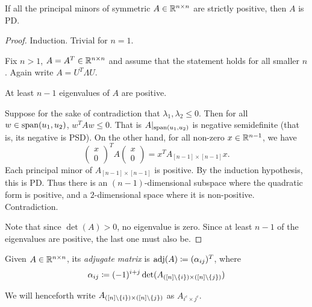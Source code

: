 \begin{lemma}
    If all the principal minors of symmetric $A \in \mathbb{R}^{n \times n}$
    are strictly positive, then $A$ is PD.
\end{lemma}
\begin{proof}
    Induction.
    Trivial for $n = 1$.

    Fix $n > 1$, $A = A^T \in \mathbb{R}^{n \times n}$ and assume that the statement
    holds for all smaller $n$.
    Again write $A = U^T \Lambda U$.

    \begin{claim}
        At least $n - 1$ eigenvalues of $A$ are positive.
    \end{claim}
    \begin{subproof}
        Suppose for the sake of contradiction that
        $\lambda_1, \lambda_2 \le 0$.
        Then for all $w \in \operatorname{span}(u_1, u_2)$,
        $w^T A w \le 0$.
        That is $A\vert_{\operatorname{span}(u_1, u_2)}$ is negative semidefinite
        (that is, its negative is PSD).
        On the other hand, for all non-zero $x \in \mathbb{R}^{n-1}$,
        we have \[
            \begin{pmatrix}
                x \\
                0
            \end{pmatrix}^T A \begin{pmatrix}
                x \\
                0
            \end{pmatrix} = x^T A_{[n-1] \times [n-1]} x.
        \] Each principal minor of $A_{[n-1] \times [n-1]}$ is positive.
        By the induction hypothesis, this is PD.
        Thus there is an $(n-1)$-dimensional subspace where the quadratic
        form is positive, and a $2$-dimensional space where it is
        non-positive.
        Contradiction.
    \end{subproof}
    Note that since $\det(A) > 0$, no eigenvalue is zero.
    Since at least $n - 1$ of the eigenvalues are positive, the last one
    must also be.
\end{proof}

\begin{definition} \label{def:adjugate}
    Given $A \in \mathbb{R}^{n \times n}$, its \emph{adjugate matrix} is
    $\operatorname{adj}(A) \coloneq (\alpha_{ij})^T$, where \[
        \alpha_{ij} \coloneq (-1)^{i + j} \det(A_{([n] \setminus \{i\}) \times ([n] \setminus \{j\})})
    \]
\end{definition}
We will henceforth write
$A_{([n] \setminus \{i\}) \times ([n] \setminus \{j\})}$ as
$A_{i^c \times j^c}$.

